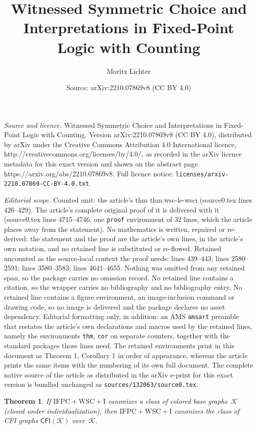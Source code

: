 \documentclass[10pt,a4paper]{amsart}
\title{Witnessed Symmetric Choice and Interpretations in Fixed-Point Logic with Counting}
\author{Moritz Lichter}
\date{Source: arXiv:2210.07869v8 (CC BY 4.0)}
\newtheorem{thm}{Theorem}
\newcommand{\CFI}[1]{\CFIsym(#1)}
\newcommand{\CFIsym}{\mathsf{CFI}}
\newcommand{\GraphClass}{\mathcal{K}}
\newcommand{\IFPCWSCI}{\ensuremath{\mathrm{IFPC{+}WSC{+}I}}}
\begin{document}
\maketitle

\noindent\emph{Source and licence.} Witnessed Symmetric Choice and Interpretations in Fixed-Point Logic with Counting. Version arXiv:2210.07869v8 (CC BY 4.0), distributed by arXiv under the Creative Commons Attribution 4.0 International licence, http://creativecommons.org/licenses/by/4.0/, as recorded in the arXiv licence metadata for this exact version and shown on the abstract page https://arxiv.org/abs/2210.07869v8. Full licence notice: \texttt{licenses/arxiv-2210.07869-CC-BY-4.0.txt}.\par\smallskip

\noindent\textit{Editorial scope.} Counted unit: the article's thm thm:wsc-le-wsci (source0.tex lines 426--429). The article's complete original proof of it is delivered with it (source0.tex lines 4715--4746, one \texttt{proof} environment of 32 lines, which the article places away from the statement). No mathematics is written, repaired or re-derived: the statement and the proof are the article's own lines, in the article's own notation, and no retained line is substituted or re-flowed.  Retained uncounted as the source-local context the proof needs: lines 439--443; lines 2580--2591; lines 3580--3583; lines 4641--4655.  Nothing was omitted from any retained span, so the package carries no omission record.  No retained line contains a citation, so the wrapper carries no bibliography and no bibliography entry.  No retained line contains a figure environment, an image-inclusion command or drawing code, so no image is delivered and the package declares no asset dependency.  Editorial formatting only, in addition: an AMS \texttt{amsart} preamble that restates the article's own declarations and macros used by the retained lines, namely the environments \texttt{thm}, \texttt{cor} on separate counters, together with the standard packages those lines need.  The retained environments print in this document as Theorem 1, Corollary 1 in order of appearance, whereas the article prints the same items with the numbering of its own full document.  The complete native source of the article as distributed in the arXiv e-print for this exact version is bundled unchanged as \texttt{sources/132063/source0.tex}.
\begin{thm}
	\label{thm:canonize-CFI if-base}
	If \IFPCWSCI{} canonizes a class of colored base graphs~$\GraphClass$ (closed under individualization),
	then \IFPCWSCI{} canonizes the class of CFI graphs $\CFI{\GraphClass}$ over~$\GraphClass$.
\end{thm}
\end{document}
